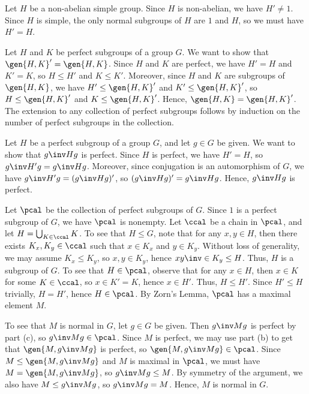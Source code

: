 \begin{solenum}
    \item Let $H$ be a non-abelian simple group.
	Since $H$ is non-abelian, we have $H' \neq 1$.
	Since $H$ is simple, the only normal subgroups of $H$ are $1$ and $H$, so we must have $H' = H$.
    \item Let $H$ and $K$ be perfect subgroups of a group $G$.
	We want to show that $\gen{H, K}' = \gen{H, K}$.
	Since $H$ and $K$ are perfect, we have $H' = H$ and $K' = K$, so $H \leq H'$ and $K \leq K'$.
	Moreover, since $H$ and $K$ are subgroups of $\gen{H, K}$, we have $H' \leq \gen{H, K}'$ and $K' \leq \gen{H, K}'$, so $H \leq \gen{H, K}'$ and $K \leq \gen{H, K}'$.
	Hence, $\gen{H, K} = \gen{H, K}'$.
	The extension to any collection of perfect subgroups follows by induction on the number of perfect subgroups in the collection.
    \item Let $H$ be a perfect subgroup of a group $G$, and let $g \in G$ be given.
	We want to show that $g\inv H g$ is perfect.
	Since $H$ is perfect, we have $H' = H$, so $g\inv H' g = g\inv H g$.
	Moreover, since conjugation is an automorphism of $G$, we have $g\inv H' g = (g\inv H g)'$, so $(g\inv H g)' = g\inv H g$.
	Hence, $g\inv H g$ is perfect.
    \item Let $\pcal$ be the collection of perfect subgroups of $G$.
	Since $1$ is a perfect subgroup of $G$, we have $\pcal$ is nonempty.
	Let $\ccal$ be a chain in $\pcal$, and let $H = \bigcup_{K \in \ccal} K$.
	To see that $H \leq G$, note that for any $x, y \in H$, then there exists $K_x, K_y \in \ccal$ such that $x \in K_x$ and $y \in K_y$.
	Without loss of generality, we may assume $K_x \leq K_y$, so $x, y \in K_y$, hence $xy\inv \in K_y \leq H$.
	Thus, $H$ is a subgroup of $G$.
	To see that $H \in \pcal$, observe that for any $x \in H$, then $x \in K$ for some $K \in \ccal$, so $x \in K' = K$, hence $x \in H'$.
	Thus, $H \leq H'$.
	Since $H' \leq H$ trivially, $H = H'$, hence $H \in \pcal$.
	By Zorn's Lemma, $\pcal$ has a maximal element $M$. 
    
    To see that $M$ is normal in $G$, let $g \in G$ be given.
	Then $g\inv M g$ is perfect by part (c), so $g\inv M g \in \pcal$.
	Since $M$ is perfect, we may use part (b) to get that $\gen{M, g\inv M g}$ is perfect, so $\gen{M, g\inv M g} \in \pcal$.
	Since $M \leq \gen{M, g\inv M g}$ and $M$ is maximal in $\pcal$, we must have $M = \gen{M, g\inv M g}$, so $g\inv M g \leq M$.
	By symmetry of the argument, we also have $M \leq g\inv M g$, so $g\inv M g = M$.
	Hence, $M$ is normal in $G$.
\end{solenum}

